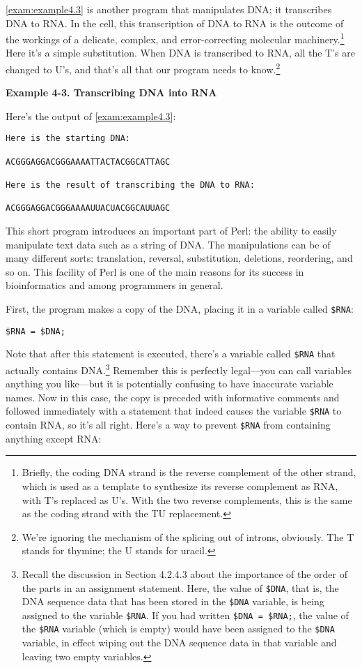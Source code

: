 \autoref{exam:example4.3} is another program that manipulates DNA; it transcribes DNA to RNA. In the cell, this transcription of DNA to RNA is the outcome of the workings of a delicate, complex, and error-correcting molecular machinery.\footnote{Briefly, the coding DNA strand is the reverse complement of the other strand, which is used as a template to synthesize its reverse complement as RNA, with T's replaced as U's. With the two reverse complements, this is the same as the coding strand with the TU replacement.} Here it's a simple substitution. When DNA is transcribed to RNA, all the T's are changed to U's, and that's all that our program needs to know.\footnote{We're ignoring the mechanism of the splicing out of introns, obviously. The T stands for thymine; the U stands for uracil.}

\textbf{Example 4-3. Transcribing DNA into RNA}



Here's the output of \autoref{exam:example4.3}:

\begin{lstlisting}
Here is the starting DNA:

ACGGGAGGACGGGAAAATTACTACGGCATTAGC

Here is the result of transcribing the DNA to RNA:

ACGGGAGGACGGGAAAAUUACUACGGCAUUAGC
\end{lstlisting}

This short program introduces an important part of Perl: the ability to easily manipulate text data such as a string of DNA. The manipulations can be of many different sorts: translation, reversal, substitution, deletions, reordering, and so on. This facility of Perl is one of the main reasons for its success in bioinformatics and among programmers in general.

First, the program makes a copy of the DNA, placing it in a variable called \verb|$RNA|:

\begin{lstlisting}
$RNA = $DNA;
\end{lstlisting}

Note that after this statement is executed, there's a variable called \verb|$RNA| that actually contains DNA.\footnote{Recall the discussion in Section 4.2.4.3 about the importance of the order of the parts in an assignment statement. Here, the value of \verb|$DNA|, that is, the DNA sequence data that has been stored in the \verb|$DNA| variable, is being assigned to the variable \verb|$RNA|. If you had written \verb|$DNA = $RNA;|, the value of the \verb|$RNA| variable (which is empty) would have been assigned to the \verb|$DNA| variable, in effect wiping out the DNA sequence data in that variable and leaving two empty variables.} Remember this is perfectly legal—you can call variables anything you like—but it is potentially confusing to have inaccurate variable names. Now in this case, the copy is preceded with informative comments and followed immediately with a statement that indeed causes the variable \verb|$RNA| to contain RNA, so it's all right.  Here's a way to prevent \verb|$RNA| from containing anything except RNA: 

